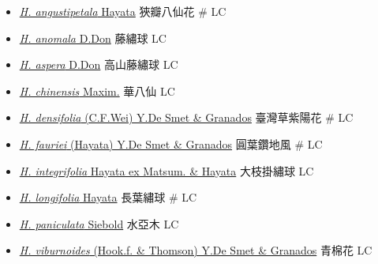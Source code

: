 \begin{itemize}
  \begin{itemize}
        \item[] \href{http://www.theplantlist.org/tpl1.1/search?q=Hydrangea+angustipetala}{\textit{H. angustipetala} Hayata}   狹瓣八仙花  \# LC
        \item[] \href{http://www.theplantlist.org/tpl1.1/search?q=Hydrangea+anomala}{\textit{H. anomala} D.Don}   藤繡球   LC
        \item[] \href{http://www.theplantlist.org/tpl1.1/search?q=Hydrangea+aspera}{\textit{H. aspera} D.Don}   高山藤繡球   LC
        \item[] \href{http://www.theplantlist.org/tpl1.1/search?q=Hydrangea+chinensis}{\textit{H. chinensis} Maxim.}   華八仙   LC
        \item[] \href{http://www.theplantlist.org/tpl1.1/search?q=Hydrangea+densifolia}{\textit{H. densifolia} (C.F.Wei) Y.De Smet \& Granados}   臺灣草紫陽花  \# LC
        \item[] \href{http://www.theplantlist.org/tpl1.1/search?q=Hydrangea+fauriei}{\textit{H. fauriei} (Hayata) Y.De Smet \& Granados}   圓葉鑽地風  \# LC
        \item[] \href{http://www.theplantlist.org/tpl1.1/search?q=Hydrangea+integrifolia}{\textit{H. integrifolia} Hayata ex Matsum. \& Hayata}   大枝掛繡球   LC
        \item[] \href{http://www.theplantlist.org/tpl1.1/search?q=Hydrangea+longifolia}{\textit{H. longifolia} Hayata}   長葉繡球  \# LC
        \item[] \href{http://www.theplantlist.org/tpl1.1/search?q=Hydrangea+paniculata}{\textit{H. paniculata} Siebold}   水亞木   LC
        \item[] \href{http://www.theplantlist.org/tpl1.1/search?q=Hydrangea+viburnoides}{\textit{H. viburnoides} (Hook.f. \& Thomson) Y.De Smet \& Granados}   青棉花   LC
  \end{itemize}
  \end{itemize}
